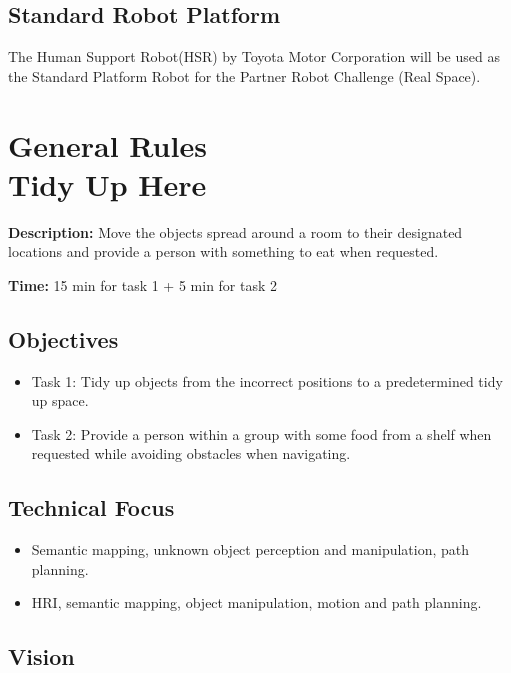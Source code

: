 \documentclass{article}
\begin{document}
\subsection{Standard Robot Platform}
The Human Support Robot\footnotemark (HSR) by Toyota Motor Corporation will be used as the Standard Platform Robot for the Partner Robot Challenge (Real Space).






\newpage
\section{General Rules \\Tidy Up Here}

\textbf{Description:} Move the objects spread around a room to their designated locations and provide a person with something to eat when requested.

\textbf{Time:} 15 min for task 1 + 5 min for task 2

\subsection{Objectives}
\begin{itemize}
    \item Task 1: Tidy up objects from the incorrect positions to a predetermined tidy up space.
    \item Task 2: Provide a person within a group with some food from a shelf when requested while avoiding obstacles when navigating.
\end{itemize}

\subsection{Technical Focus}
\begin{itemize}
    \item Semantic mapping, unknown object perception and manipulation, path planning.
    \item HRI, semantic mapping, object manipulation, motion and path planning.
\end{itemize}

\subsection{Vision}
\end{document}
